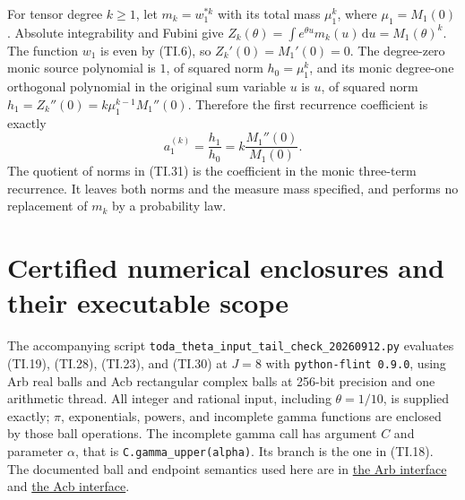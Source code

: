 \documentclass[11pt]{article}
\newcommand{\dd}{\,\mathrm d}
\begin{document}
For tensor degree $k\ge1$, let $m_k=w_1^{*k}$ with its total mass
$\mu_1^k$, where $\mu_1=M_1(0)$. Absolute integrability and Fubini give
$Z_k(\theta)=\int e^{\theta u}m_k(u)\dd u=M_1(\theta)^k$.
The function $w_1$ is even by (TI.6), so $Z_k'(0)=M_1'(0)=0$.
The degree-zero monic source polynomial is $1$, of squared norm
$h_0=\mu_1^k$, and its monic degree-one orthogonal polynomial in
the original sum variable $u$ is $u$, of squared norm
$h_1=Z_k''(0)=k\mu_1^{k-1}M_1''(0)$. Therefore the first recurrence
coefficient is exactly
\begin{equation}
 a_1^{(k)}=\frac{h_1}{h_0}
 =k\frac{M_1''(0)}{M_1(0)}. \tag{TI.31}
\end{equation}
The quotient of norms in (TI.31) is the coefficient in the monic
three-term recurrence. It leaves both norms and the measure mass
specified, and performs no replacement of $m_k$ by a probability law.

\section{Certified numerical enclosures and their executable scope}

The accompanying script
\texttt{toda\_theta\_input\_tail\_check\_20260912.py} evaluates
(TI.19), (TI.28), (TI.23), and (TI.30) at $J=8$ with
\texttt{python-flint 0.9.0}, using Arb real balls and Acb rectangular
complex balls at 256-bit precision and one arithmetic thread.
All integer and rational input, including $\theta=1/10$, is supplied
exactly; $\pi$, exponentials, powers, and incomplete gamma functions
are enclosed by those ball operations. The incomplete gamma call has
argument $C$ and parameter $\alpha$, that is
\texttt{C.gamma\_upper(alpha)}. Its branch is the one in (TI.18).
The documented ball and endpoint semantics used here are in
\href{https://python-flint.readthedocs.io/en/latest/arb.html}{the Arb interface}
and
\href{https://python-flint.readthedocs.io/en/latest/acb.html}{the Acb interface}.
\end{document}

